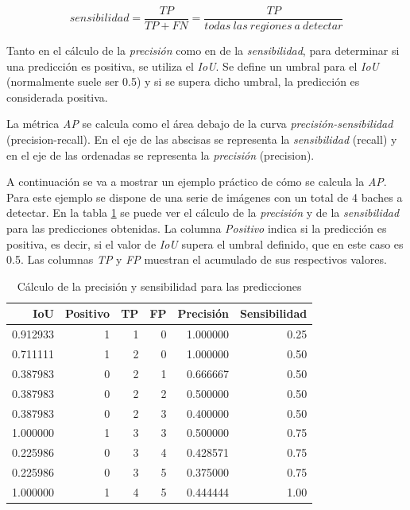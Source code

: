 \begin{equation}
	sensibilidad = \frac{TP}{TP + FN} = \frac{TP}{todas\ las\ regiones\ a\ detectar}
	\nonumber
\end{equation}

Tanto en el cálculo de la \textit{precisión} como en de la \textit{sensibilidad}, para determinar si una predicción es positiva, se utiliza el \textit{IoU}. Se define un umbral para el \textit{IoU} (normalmente suele ser 0.5) y si se supera dicho umbral, la predicción es considerada positiva.

La métrica \textit{AP} se calcula como el área debajo de la curva \textit{precisión-sensibilidad} (precision-recall). En el eje de las abscisas se representa la \textit{sensibilidad} (recall) y en el eje de las ordenadas se representa la \textit{precisión} (precision).

A continuación se va a mostrar un ejemplo práctico de cómo se calcula la \textit{AP}. Para este ejemplo se dispone de una serie de imágenes con un total de 4 baches a detectar. En la tabla \ref{tab:apprecisionrecalltable} se puede ver el cálculo de la \textit{precisión} y de la \textit{sensibilidad} para las predicciones obtenidas. La columna \textit{Positivo} indica si la predicción es positiva, es decir, si el valor de \textit{IoU} supera el umbral definido, que en este caso es 0.5. Las columnas \textit{TP} y \textit{FP} muestran el acumulado de sus respectivos valores.

\begin{table}[H]
	\centering
	\begin{tabular}{rrrrrr}
		\toprule
		IoU &  Positivo &  TP &  FP &  Precisión &  Sensibilidad \\
		\midrule
		0.912933 &         1 &   1 &   0 &   1.000000 &          0.25 \\
		0.711111 &         1 &   2 &   0 &   1.000000 &          0.50 \\
		0.387983 &         0 &   2 &   1 &   0.666667 &          0.50 \\
		0.387983 &         0 &   2 &   2 &   0.500000 &          0.50 \\
		0.387983 &         0 &   2 &   3 &   0.400000 &          0.50 \\
		1.000000 &         1 &   3 &   3 &   0.500000 &          0.75 \\
		0.225986 &         0 &   3 &   4 &   0.428571 &          0.75 \\
		0.225986 &         0 &   3 &   5 &   0.375000 &          0.75 \\
		1.000000 &         1 &   4 &   5 &   0.444444 &          1.00 \\
		\bottomrule
	\end{tabular}
	\caption{Cálculo de la precisión y sensibilidad para las predicciones}
	\label{tab:apprecisionrecalltable}
\end{table}

